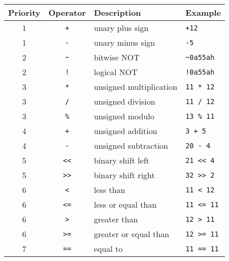         \enlargethispage{6\baselineskip}
        \begin{table}[h!]
            \centering
            \begin{tabular}{|c|c|l|l|}
                \hline
                \textbf{Priority} & \textbf{Operator} & \textbf{Description} & \textbf{Example} \\\hline
                1        & \texttt{+}    & unary plus sign         & \texttt{+12}               \\\hline
                1        & \texttt{-}    & unary minus sign        & \texttt{-5}                \\\hline
                2        & \texttt{\~{}} & bitwise NOT             & \texttt{\~{}0a55ah}        \\\hline
                2        & \texttt{!}    & logical NOT             & \texttt{!0a55ah}           \\\hline
                3        & \texttt{*}    & unsigned multiplication & \texttt{11 * 12}           \\\hline
                3        & \texttt{/}    & unsigned division       & \texttt{11 / 12}           \\\hline
                3        & \texttt{\%}   & unsigned modulo         & \texttt{13 \% 11}          \\\hline
                4        & \texttt{+}    & unsigned addition       & \texttt{3 + 5}             \\\hline
                4        & \texttt{-}    & unsigned subtraction    & \texttt{20 - 4}            \\\hline
                5        & \texttt{<{}<} & binary shift left       & \texttt{21 <{}< 4}         \\\hline
                5        & \texttt{>{}>} & binary shift right      & \texttt{32 >{}> 2}         \\\hline
                6        & \texttt{<}    & less than               & \texttt{11 < 12}           \\\hline
                6        & \texttt{<=}   & less or equal than      & \texttt{11 <= 11}          \\\hline
                6        & \texttt{>}    & greater than            & \texttt{12 > 11}           \\\hline
                6        & \texttt{>=}   & greater or equal than   & \texttt{12 >= 11}          \\\hline
                7        & \texttt{==}   & equal to                & \texttt{11 == 11}          \\\hline

\end{tabular}
\end{table}
